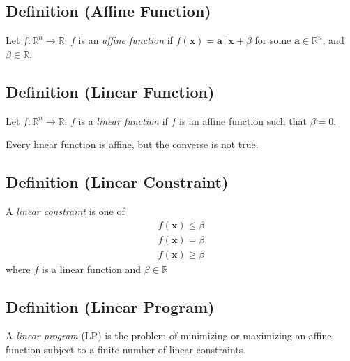 \begin{defbox}
    \subsection{Definition (Affine Function)}
    Let $f:\mathbb{R}^n\rightarrow\mathbb{R}$. $f$ is an \emph{affine function} if
    $f(\bm{x})=\bm{a}^\top \bm{x}+\beta$ for some $\bm{a}\in\mathbb{R}^n$, and $\beta\in\mathbb{R}$.    
\end{defbox}

\begin{defbox}
    \subsection{Definition (Linear Function)}
    Let $f:\mathbb{R}^n\rightarrow\mathbb{R}$. $f$ is a \emph{linear function} if
    $f$ is an affine function such that $\beta=0$.
\end{defbox}

\begin{remark}
    Every linear function is affine, but the converse is not true.
\end{remark}

\begin{defbox}
    \subsection{Definition (Linear Constraint)}
    A \emph{linear constraint} is one of
    \begin{align*}
        f(\bm{x})\le \beta\\
        f(\bm{x})=\beta\\
        f(\bm{x})\ge \beta
    \end{align*}
    where $f$ is a linear function and $ \beta\in\mathbb{R} $
\end{defbox}

\begin{defbox}
    \subsection{Definition (Linear Program)}
    A \emph{linear program} (LP) is the problem of minimizing or
    maximizing an affine function subject to a finite number
    of linear constraints.
\end{defbox}